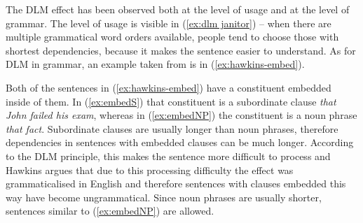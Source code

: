 The DLM effect has been observed both at the level of usage and at the level of grammar. The level of usage is visible in (\ref{ex:dlm janitor}) -- when there are multiple grammatical word orders available, people tend to choose those with shortest dependencies, because it makes the sentence easier to understand. As for DLM in grammar, an example taken from \citet[p.~20]{Hawkins-1994} is in (\ref{ex:hawkins-embed}). 
\begin{exe}
\ex\label{ex:hawkins-embed}
\begin{xlist}
	\label{ex:embedS}
	\label{ex:embedNP}
\end{xlist}
\end{exe}
Both of the sentences in (\ref{ex:hawkins-embed}) have a constituent embedded inside of them. In (\ref{ex:embedS}) that constituent is a subordinate clause \textsl{that John failed his exam}, whereas in (\ref{ex:embedNP}) the constituent is a noun phrase \textsl{that fact}. Subordinate clauses are usually longer than noun phrases, therefore dependencies in sentences with embedded clauses can be much longer. According to the DLM principle, this makes the sentence more difficult to process and Hawkins argues that due to this processing difficulty the effect was grammaticalised in English and therefore sentences with clauses embedded this way have become ungrammatical. Since noun phrases are usually shorter, sentences similar to (\ref{ex:embedNP}) are allowed. 





